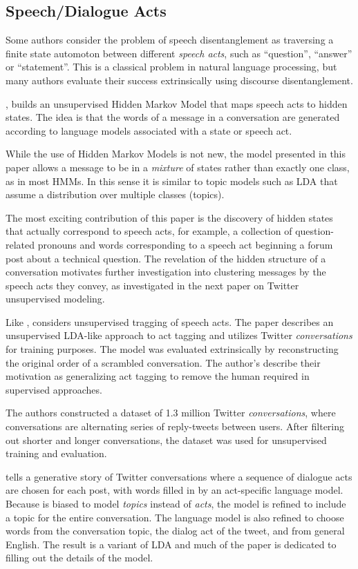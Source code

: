 \documentclass[11pt]{article}
\begin{document}
\subsection{Speech/Dialogue Acts}
Some authors consider the problem of speech disentanglement as traversing 
a finite state automoton between different \textit{speech acts}, such as
``question'', ``answer'' or ``statement''. This is a classical problem in
natural language processing, but many authors evaluate their success extrinsically 
using discourse disentanglement.

\cite{Paula}, builds an unsupervised Hidden Markov Model that 
maps speech acts to hidden states. The idea is that the words of a message in a conversation are generated 
according to language models associated
with a state or speech act. 

While the use of Hidden Markov Models is not new, the model presented in this
paper allows a message to be in a \emph{mixture} of states rather than exactly
one class, as in most HMMs. In this sense it is similar to topic models such as
LDA that assume a distribution over multiple classes (topics).

The most exciting contribution of this paper is the discovery of hidden states
that actually correspond to speech acts, for example, a collection of
question-related pronouns and words corresponding to a speech act beginning a
forum post about a technical question. The revelation of the hidden structure of
a conversation motivates further investigation into clustering messages by the
speech acts they convey, as investigated in the next paper on Twitter
unsupervised modeling.

Like \cite{Paula}, \cite{Ritter2010a} considers unsupervised tragging of speech acts.
The paper describes an unsupervised LDA-like approach to act tagging 
and utilizes Twitter \textit{conversations} for
training purposes. The model was evaluated extrinsically by reconstructing 
the original order of a scrambled conversation. The author's describe their motivation as
generalizing act tagging to remove the human required in supervised approaches. 

The authors constructed a dataset of 1.3 million Twitter \textit{conversations}, 
where conversations are alternating series of reply-tweets between users. After filtering out shorter 
and longer conversations, the dataset was used for unsupervised training and evaluation.

\cite{Ritter2010a} tells a generative story of Twitter conversations where a sequence of dialogue
acts are chosen for each post, with words filled in by an act-specific language model.
Because is biased to model \textit{topics}
instead of \textit{acts}, the model is refined to include a topic 
for the entire conversation. The language model is also refined to choose words from
the conversation topic, the dialog act of the tweet, and from general English. The result
is a variant of LDA and much of the paper is dedicated to filling out the details of the model.
\end{document}

